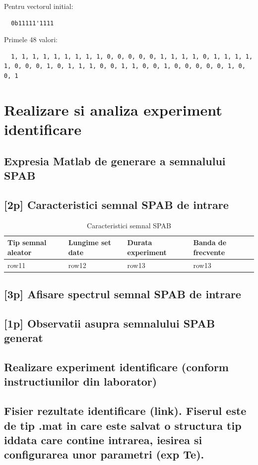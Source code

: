 \documentclass[12pt,english]{article}
\begin{document}
Pentru vectorul initial:
\begin{lstlisting}
  0b11111'1111
\end{lstlisting}

Primele 48 valori:
\begin{lstlisting}
  1, 1, 1, 1, 1, 1, 1, 1, 1, 0, 0, 0, 0, 0, 1, 1, 1, 1, 0, 1, 1, 1, 1, 1, 0, 0, 0, 1, 0, 1, 1, 1, 0, 0, 1, 1, 0, 0, 1, 0, 0, 0, 0, 0, 1, 0, 0, 1
\end{lstlisting}

\section { Realizare si analiza experiment identificare }
\subsection { Expresia Matlab de generare a semnalului SPAB }
\subsection { [2p] Caracteristici semnal SPAB de intrare }
\begin{table}[H]
  \centering
    \begin{tabular}{|l|l|l|l|}
      \hline
      Tip semnal aleator & Lungime set date & Durata experiment & Banda de frecvente \\
      \hline
      row11 & row12 & row13 & row13 \\
      \hline
    \end{tabular}
    \caption{Caracteristici semnal SPAB}
\end{table}

\subsection { [3p] Afisare spectrul semnal SPAB de intrare }
\subsection { [1p] Observatii asupra semnalului SPAB generat }
\subsection { Realizare experiment identificare (conform instructiunilor din laborator) }
\subsection { Fisier rezultate identificare (link). Fiserul este de tip .mat in care este salvat o structura tip iddata care contine intrarea, iesirea si configurarea unor parametri (exp Te). }
\end{document}
